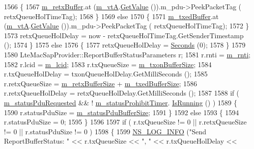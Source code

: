 \begin{DoxyCode}
1566         \{
1567           \hyperlink{classns3_1_1LteRlcAm_ab34bb5fce080a41395ad7ea5789af8d0}{m\_retxBuffer}.at (\hyperlink{classns3_1_1LteRlcAm_a55514b9f03d8f70cdbb8cdac053f39b5}{m\_vtA}.\hyperlink{classns3_1_1SequenceNumber10_a9dcaea04bc415e169e7e0020ce579d01}{GetValue} ()).m\_pdu->PeekPacketTag (
      retxQueueHolTimeTag);
1568         \}
1569       \textcolor{keywordflow}{else}
1570         \{
1571           \hyperlink{classns3_1_1LteRlcAm_afabb45c6de7da492347b45c139de0c28}{m\_txedBuffer}.at (\hyperlink{classns3_1_1LteRlcAm_a55514b9f03d8f70cdbb8cdac053f39b5}{m\_vtA}.\hyperlink{classns3_1_1SequenceNumber10_a9dcaea04bc415e169e7e0020ce579d01}{GetValue} ()).m\_pdu->PeekPacketTag (
      retxQueueHolTimeTag);
1572         \}      
1573       retxQueueHolDelay = now - retxQueueHolTimeTag.GetSenderTimestamp ();
1574     \}
1575   \textcolor{keywordflow}{else} 
1576     \{      
1577       retxQueueHolDelay = \hyperlink{group__timecivil_ga33c34b816f8ff6628e33d5c8e9713b9e}{Seconds} (0);
1578     \}
1579 
1580   LteMacSapProvider::ReportBufferStatusParameters r;
1581   r.rnti = \hyperlink{classns3_1_1LteRlc_a48ab0a78e7f2687337075b1c8832df70}{m\_rnti};
1582   r.lcid = \hyperlink{classns3_1_1LteRlc_a051085e9b27883e7ba4b98ad7242fd8a}{m\_lcid};
1583   r.txQueueSize = \hyperlink{classns3_1_1LteRlcAm_a3e8db6b5bc1d3fcc215d554e8d347eda}{m\_txonBufferSize};
1584   r.txQueueHolDelay = txonQueueHolDelay.GetMilliSeconds ();
1585   r.retxQueueSize = \hyperlink{classns3_1_1LteRlcAm_af270916ffd1805b027a7b9cc05c91e7d}{m\_retxBufferSize} + \hyperlink{classns3_1_1LteRlcAm_add3fe05a0fd3a4ad1fcb7db0239c698f}{m\_txedBufferSize};
1586   r.retxQueueHolDelay = retxQueueHolDelay.GetMilliSeconds ();
1587 
1588   \textcolor{keywordflow}{if} ( \hyperlink{classns3_1_1LteRlcAm_afd4ce0824f86cfb394f0492383f98a3b}{m\_statusPduRequested} && ! \hyperlink{classns3_1_1LteRlcAm_af32da019a7f906fd00bba0f15927817a}{m\_statusProhibitTimer}.
      \hyperlink{classns3_1_1EventId_aabf8476d1a080c199ea0c6aa9ccea372}{IsRunning} () )
1589     \{
1590       r.statusPduSize = \hyperlink{classns3_1_1LteRlcAm_a722cecd1994be0d51675dea14b187623}{m\_statusPduBufferSize};
1591     \}
1592   \textcolor{keywordflow}{else}
1593     \{
1594       r.statusPduSize = 0;
1595     \}
1596 
1597   \textcolor{keywordflow}{if} ( r.txQueueSize != 0 || r.retxQueueSize != 0 || r.statusPduSize != 0 )
1598     \{
1599       \hyperlink{group__logging_gafbd73ee2cf9f26b319f49086d8e860fb}{NS\_LOG\_INFO} (\textcolor{stringliteral}{"Send ReportBufferStatus: "} << r.txQueueSize << \textcolor{stringliteral}{", "} << r.txQueueHolDelay << \textcolor{stringliteral}{
}
\end{DoxyCode}
